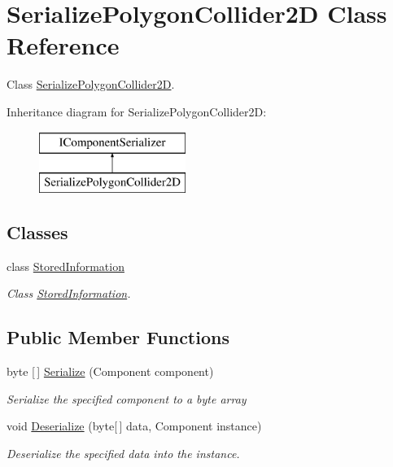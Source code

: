 \hypertarget{class_serialize_polygon_collider2_d}{}\section{Serialize\+Polygon\+Collider2D Class Reference}
\label{class_serialize_polygon_collider2_d}


Class \hyperlink{class_serialize_polygon_collider2_d}{Serialize\+Polygon\+Collider2D}.  


Inheritance diagram for Serialize\+Polygon\+Collider2D\+:\begin{figure}[H]
\begin{center}
\leavevmode
\includegraphics[height=2.000000cm]{class_serialize_polygon_collider2_d}
\end{center}
\end{figure}
\subsection*{Classes}
\begin{DoxyCompactItemize}
\item 
class \hyperlink{class_serialize_polygon_collider2_d_1_1_stored_information}{Stored\+Information}
\begin{DoxyCompactList}\small\item\em Class \hyperlink{class_serialize_polygon_collider2_d_1_1_stored_information}{Stored\+Information}. \end{DoxyCompactList}\end{DoxyCompactItemize}
\subsection*{Public Member Functions}
\begin{DoxyCompactItemize}
\item 
byte \mbox{[}$\,$\mbox{]} \hyperlink{class_serialize_polygon_collider2_d_a0f488a1150cc7f8786e659577a4d9488}{Serialize} (Component component)
\begin{DoxyCompactList}\small\item\em Serialize the specified component to a byte array \end{DoxyCompactList}\item 
void \hyperlink{class_serialize_polygon_collider2_d_a91694bef6812922cf021805d76b9d7e4}{Deserialize} (byte\mbox{[}$\,$\mbox{]} data, Component instance)
\begin{DoxyCompactList}\small\item\em Deserialize the specified data into the instance. \end{DoxyCompactList}\end{DoxyCompactItemize}


